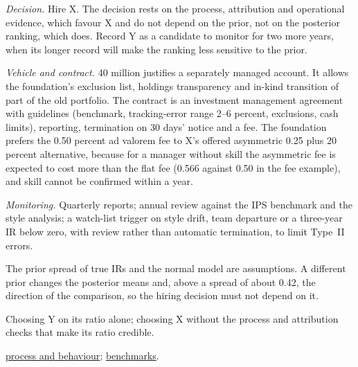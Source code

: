 \begin{qfexample}
\emph{Decision.} Hire X. The decision rests on the process, attribution and operational evidence, which favour X and do not depend on the prior, not on the posterior ranking, which does. Record Y as a candidate to monitor for two more years, when its longer record will make the ranking less sensitive to the prior.

\emph{Vehicle and contract.} 40 million justifies a separately managed account. It allows the foundation's exclusion list, holdings transparency and in-kind transition of part of the old portfolio. The contract is an investment management agreement with guidelines (benchmark, tracking-error range 2--6 percent, exclusions, cash limits), reporting, termination on 30 days' notice and a fee. The foundation prefers the 0.50 percent ad valorem fee to X's offered asymmetric 0.25 plus 20 percent alternative, because for a manager without skill the asymmetric fee is expected to cost more than the flat fee (0.566 against 0.50 in the fee example), and skill cannot be confirmed within a year.

\emph{Monitoring.} Quarterly reports; annual review against the IPS benchmark and the style analysis; a watch-list trigger on style drift, team departure or a three-year IR below zero, with review rather than automatic termination, to limit Type~II errors.

 The prior spread of true IRs and the normal model are assumptions. A different prior changes the posterior means and, above a spread of about 0.42, the direction of the comparison, so the hiring decision must not depend on it.

 Choosing Y on its ratio alone; choosing X without the process and attribution checks that make its ratio credible.

 \hyperref[meth:manager-philosophy-process-behaviour]{process and behaviour}; \hyperref[meth:benchmark-selection-quality]{benchmarks}.

\end{qfexample}

